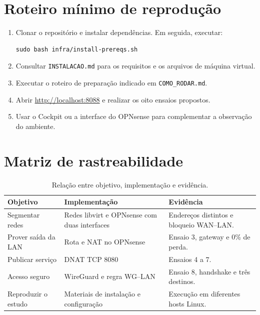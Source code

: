 \documentclass[12pt,a4paper]{article}
\newcommand{\arquivo}[1]{\texttt{#1}}
\begin{document}
\appendix\newpage
\section{Roteiro mínimo de reprodução}
\begin{enumerate}
\item Clonar o repositório e instalar dependências. Em seguida, executar:
\begin{lstlisting}[style=codigo]
sudo bash infra/install-prereqs.sh
\end{lstlisting}
\item Consultar \arquivo{INSTALACAO.md} para os requisitos e os arquivos de máquina virtual.
\item Executar o roteiro de preparação indicado em \arquivo{COMO\_RODAR.md}.
\item Abrir \url{http://localhost:8088} e realizar os oito ensaios propostos.
\item Usar o Cockpit ou a interface do OPNsense para complementar a observação do ambiente.
\end{enumerate}

\section{Matriz de rastreabilidade}
\begin{table}[H]\centering
\caption{Relação entre objetivo, implementação e evidência.}
\begin{tabularx}{\textwidth}{P{3.2cm}YY}\toprule
\textbf{Objetivo}&\textbf{Implementação}&\textbf{Evidência}\\\midrule
Segmentar redes&Redes libvirt e OPNsense com duas interfaces&Endereços distintos e bloqueio WAN--LAN.\\
Prover saída da LAN&Rota e NAT no OPNsense&Ensaio 3, gateway e 0\% de perda.\\
Publicar serviço&DNAT TCP 8080&Ensaios 4 a 7.\\
Acesso seguro&WireGuard e regra WG--LAN&Ensaio 8, handshake e três destinos.\\
Reproduzir o estudo&Materiais de instalação e configuração&Execução em diferentes hosts Linux.\\\bottomrule
\end{tabularx}\end{table}
\end{document}
